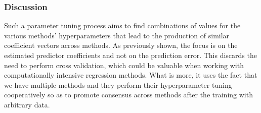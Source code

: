 \subsubsection{Discussion}
Such a parameter tuning process aims to find combinations of values for the various methods' hyperparameters that lead to the production of similar coefficient vectors across methods. As previously shown, the focus is on the estimated predictor coefficients and not on the prediction error. This discards the need to perform cross validation, which could be valuable when working with computationally intensive regression methods. What is more, it uses the fact that we have multiple methods and they perform their hyperparameter tuning cooperatively so as to promote consensus across methods after the training with arbitrary data.



